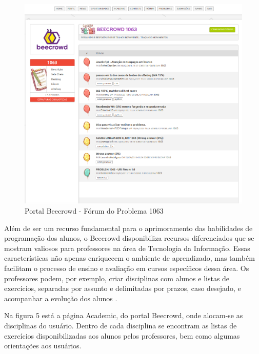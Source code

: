 \begin{figure}[h!]
	   \centering
            \caption{Portal Beecrowd - Fórum do Problema 1063}
            \label{fig:ModeloConceitual}
	   	\includegraphics[scale=0.3]{pictures/beecrowd_1063.png}
\end{figure}

Além de ser um recurso fundamental para o aprimoramento das habilidades de programação dos alunos, o Beecrowd disponibiliza recursos diferenciados que se mostram valiosos para professores na área de Tecnologia da Informação. Essas características não apenas enriquecem o ambiente de aprendizado, mas também facilitam o processo de ensino e avaliação em cursos específicos dessa área. Os professores podem, por exemplo, criar disciplinas com alunos e listas de exercícios, separadas por assunto e delimitadas por prazos, caso desejado, e acompanhar a evolução dos alunos \cite[p.~239]{beztonin2014}.

Na figura 5 está a página Academic, do portal Beecrowd, onde alocam-se as disciplinas do usuário. Dentro de cada disciplina se encontram as listas de exercícios disponibilizadas aos alunos pelos professores, bem como algumas orientações aos usuários.

